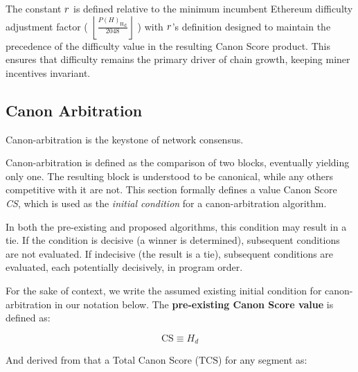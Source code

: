 \documentclass[11pt]{article}
\theoremstyle{plain}
\begin{document}
The constant $r$ is defined relative to
the minimum incumbent Ethereum difficulty adjustment factor (
    $\left\lfloor\frac{{P(H)_{\mathrm{H}}}_{\mathrm{d}}}{2048}\right\rfloor$
)
with $r$'s definition designed
to maintain the precedence of the difficulty value in the resulting Canon Score product.
This ensures that difficulty remains the primary driver of chain growth,
keeping miner incentives invariant.


\subsection{\small{Canon Arbitration}}

Canon-arbitration is the keystone of network consensus.

Canon-arbitration is defined as the comparison of two blocks, eventually yielding only one.
The resulting block is understood to be canonical, while any others competitive with it are not.
This section formally defines a value Canon Score \textit{CS}, which is used as
the \textit{initial condition} for a canon-arbitration algorithm.

In both the pre-existing and proposed algorithms, this condition may result in a tie.
If the condition is decisive (a winner is determined),
subsequent conditions are not evaluated.
If indecisive (the result is a tie), subsequent conditions are evaluated,
each potentially decisively, in program order.

For the sake of context, we write the assumed existing initial condition for
canon-arbitration in our notation below. The \textbf{pre-existing Canon Score value} is defined as:

\begin{equation}
\mathrm{CS} \equiv H_d
\end{equation}

And derived from that a Total Canon Score ($\mathrm{TCS}$) for any segment as:
\end{document}
